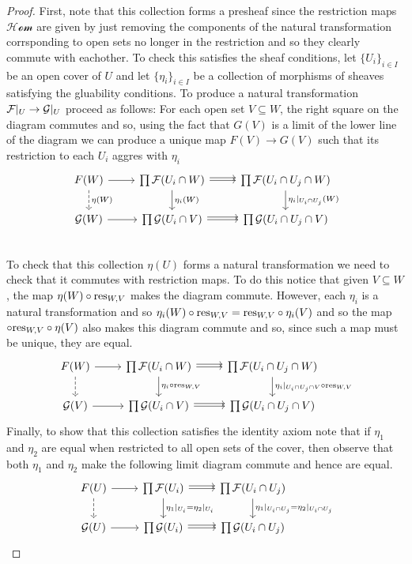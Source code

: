 \begin{proof}
    First, note that this collection forms a presheaf since the restriction maps $\mathcal{Hom}$ are given by just removing the components of the natural transformation corrsponding to open sets no longer in the restriction and so they clearly commute with eachother. To check this satisfies the sheaf conditions, let $\{U_i\}_{i \in I}$ be an open cover of $U$ and let $\{\eta_i\}_{i \in I}$ be a collection of morphisms of sheaves satisfying the gluability conditions. To produce a natural transformation $\mathcal{F}|_U \to \mathcal{G}|_U$ proceed as follows: For each open set $V \subseteq W$, the right square on the diagram commutes and so, using the fact that $G(V)$ is a limit of the lower line of the diagram we can produce a unique map $F(V) \to G(V)$ such that its restriction to each $U_i$ aggres with $\eta_i$ 
    \[ \begin{tikzcd}
        F(W) \arrow[r] \arrow[d, dashed, "\eta(W)"] & \prod \cF(U_i \cap W) \arrow[r] \arrow[r, shift left] \arrow[d, "\eta_i(W)"] & \prod \cF(U_i \cap U_j \cap W) \arrow[d, "\eta_i|_{U_i \cap U_j}(W)"] \\ 
        \cG(W) \arrow[r] & \prod \cG(U_i \cap V) \arrow[r] \arrow[r, shift left] & \prod \cG(U_i \cap U_j \cap V) \\
    \end{tikzcd} \] 
    To check that this collection $\eta(U)$ forms a natural transformation we need to check that it commutes with restriction maps. To do this notice that given $V \subseteq W$, the map $\eta(W) \circ \text{res}_{W, V}$ makes the diagram commute. However, each $\eta_i$ is a natural transformation and so $\eta_i(W) \circ \text{res}_{W, V} = \text{res}_{W, V} \circ \eta_i(V)$ and so the map $\circ \text{res}_{W, V} \circ \eta(V)$ also makes this diagram commute and so, since such a map must be unique, they are equal. 
    \[ \begin{tikzcd}
    F(W) \arrow[r] \arrow[d, dashed] & \prod \cF(U_i \cap W) \arrow[r] \arrow[r, shift left] \arrow[d, "\eta_i \circ \res_{W,V}"] & \prod \cF(U_i \cap U_j \cap W) \arrow[d, "\eta_i|_{U_i \cap U_j \cap V} \circ \res_{W, V}"] \\ 
    \cG(V) \arrow[r] & \prod \cG(U_i \cap V) \arrow[r] \arrow[r, shift left] & \prod \cG(U_i \cap U_j \cap V) 
    \end{tikzcd} \] 
    Finally, to show that this collection satisfies the identity axiom note that if $\eta_1$ and $\eta_2$ are equal when restricted to all open sets of the cover, then observe that both $\eta_1$ and $\eta_2$ make the following limit diagram commute and hence are equal. 
    \[ \begin{tikzcd}
        F(U) \arrow[r] \arrow[d, dashed] & \prod \cF(U_i) \arrow[r] \arrow[r, shift left] \arrow[d, "\eta_1|_{U_i} = \eta_2|_{U_i}"] & \prod \cF(U_i \cap U_j) \arrow[d, "\eta_1|_{U_i \cap U_j} = \eta_2|_{U_i \cap U_j}"] \\ 
        \cG(U) \arrow[r] & \prod \cG(U_i) \arrow[r] \arrow[r, shift left] & \prod \cG(U_i \cap U_j) 
    \end{tikzcd} \]
\end{proof}

